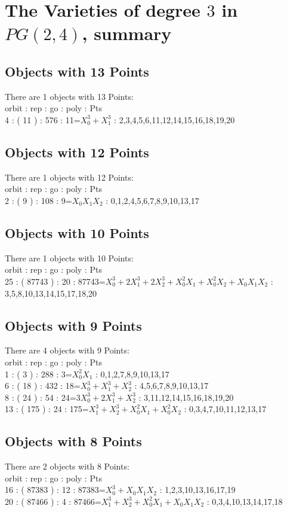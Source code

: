 \section*{The Varieties of degree $3$ in $PG(2, 4)$, summary}
\subsection*{Objects with 13 Points}
There are 1 objects with 13 Points: \\
orbit : rep : go : poly : Pts\\
4 : ( 11 ) : 576 : 11=$X_0^3 + X_1^3$ : 2,3,4,5,6,11,12,14,15,16,18,19,20\\
\subsection*{Objects with 12 Points}
There are 1 objects with 12 Points: \\
orbit : rep : go : poly : Pts\\
2 : ( 9 ) : 108 : 9=$X_0X_1X_2$ : 0,1,2,4,5,6,7,8,9,10,13,17\\
\subsection*{Objects with 10 Points}
There are 1 objects with 10 Points: \\
orbit : rep : go : poly : Pts\\
25 : ( 87743 ) : 20 : 87743=$X_0^3 + 2X_1^3 + 2X_2^3 + X_0^2X_1 + X_0^2X_2 + X_0X_1X_2$ : 3,5,8,10,13,14,15,17,18,20\\
\subsection*{Objects with 9 Points}
There are 4 objects with 9 Points: \\
orbit : rep : go : poly : Pts\\
1 : ( 3 ) : 288 : 3=$X_0^2X_1$ : 0,1,2,7,8,9,10,13,17\\
6 : ( 18 ) : 432 : 18=$X_0^3 + X_1^3 + X_2^3$ : 4,5,6,7,8,9,10,13,17\\
8 : ( 24 ) : 54 : 24=$3X_0^3 + 2X_1^3 + X_2^3$ : 3,11,12,14,15,16,18,19,20\\
13 : ( 175 ) : 24 : 175=$X_1^3 + X_2^3 + X_0^2X_1 + X_0^2X_2$ : 0,3,4,7,10,11,12,13,17\\
\subsection*{Objects with 8 Points}
There are 2 objects with 8 Points: \\
orbit : rep : go : poly : Pts\\
16 : ( 87383 ) : 12 : 87383=$X_0^3 + X_0X_1X_2$ : 1,2,3,10,13,16,17,19\\
20 : ( 87466 ) : 4 : 87466=$X_1^3 + X_2^3 + X_0^2X_1 + X_0X_1X_2$ : 0,3,4,10,13,14,17,18\\
